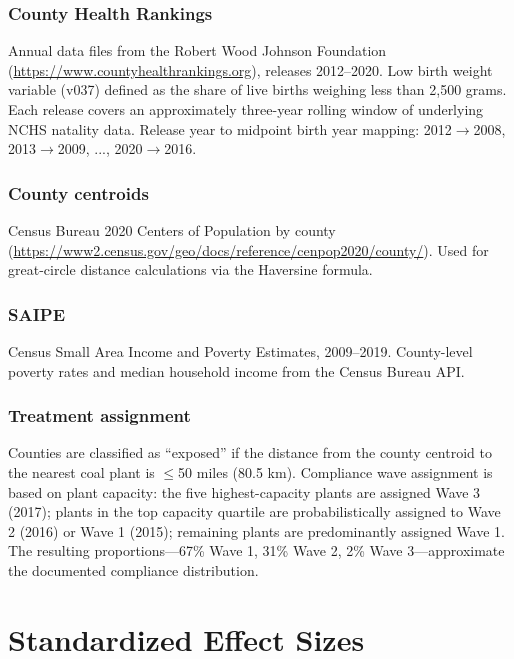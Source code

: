 \documentclass[12pt]{article}
\begin{document}
\subsubsection*{County Health Rankings} Annual data files from the Robert Wood Johnson Foundation (\url{https://www.countyhealthrankings.org}), releases 2012--2020. Low birth weight variable (v037) defined as the share of live births weighing less than 2,500 grams. Each release covers an approximately three-year rolling window of underlying NCHS natality data. Release year to midpoint birth year mapping: 2012$\rightarrow$2008, 2013$\rightarrow$2009, ..., 2020$\rightarrow$2016.

\subsubsection*{County centroids} Census Bureau 2020 Centers of Population by county (\url{https://www2.census.gov/geo/docs/reference/cenpop2020/county/}). Used for great-circle distance calculations via the Haversine formula.

\subsubsection*{SAIPE} Census Small Area Income and Poverty Estimates, 2009--2019. County-level poverty rates and median household income from the Census Bureau API.

\subsubsection*{Treatment assignment} Counties are classified as ``exposed'' if the distance from the county centroid to the nearest coal plant is $\leq$50 miles (80.5 km). Compliance wave assignment is based on plant capacity: the five highest-capacity plants are assigned Wave 3 (2017); plants in the top capacity quartile are probabilistically assigned to Wave 2 (2016) or Wave 1 (2015); remaining plants are predominantly assigned Wave 1. The resulting proportions---67\% Wave 1, 31\% Wave 2, 2\% Wave 3---approximate the documented compliance distribution.


\section{Standardized Effect Sizes}
\label{sec:sde}


\end{document}

